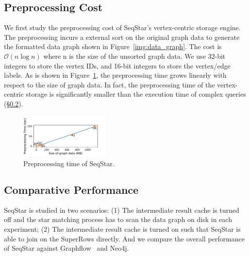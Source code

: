 \subsection{Preprocessing Cost}
We first study the preprocessing cost of SeqStar's vertex-centric storage engine.
The preprocessing incurs a external sort on the original graph data to generate the formatted data graph shown in Figure~\ref{img:data_graph}.
The cost is $\mathcal{O}(n \log n)$ where n is the size of the unsorted graph data.
We use 32-bit integers to store the vertex IDs, and 16-bit integers to store the vertex/edge labels.
As is shown in Figure~\ref{img:exp_preprocessing}, the preprocessing time grows linearly with respect to the size of graph data.
In fact, the preprocessing time of the vertex-centric storage is significantly smaller than the execution time of complex queries (\S\ref{sec:experiments_compare}).

\begin{figure}[ht]
  \centering
  \includegraphics[width=0.4\textwidth]{img/exp_preprocessing.pdf}
  \caption{Preprocessing time of SeqStar.}\label{img:exp_preprocessing}
\end{figure}
\subsection{Comparative Performance}\label{sec:experiments_compare}
SeqStar is studied in two scenarios:
(1) The intermediate result cache is turned off and the star matching process has to scan the data graph on disk in each experiment;
(2) The intermediate result cache is turned on such that SeqStar is able to join on the SuperRows directly.
And we compare the overall performance of SeqStar against Graphflow~\cite{DBLP:journals/pvldb/MhedhbiS19} and Neo4j.

